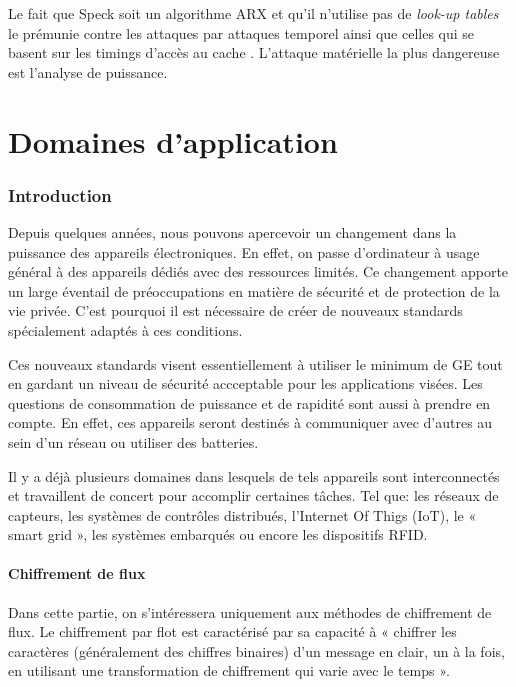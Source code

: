 			Le fait que Speck soit un algorithme ARX
			et qu'il n'utilise pas de \textit{look-up tables} le prémunie contre
			les attaques par attaques temporel ainsi que celles qui se basent sur les
			timings d'accès au cache \cite{speck_design}. L'attaque matérielle
			la plus dangereuse est l'analyse de puissance.

\newpage
\part{Domaines d'application}

	\section{Introduction}


	Depuis quelques années, nous pouvons apercevoir un changement dans la
	puissance des appareils électroniques. En effet, on passe d'ordinateur à usage
	général à des appareils dédiés avec des ressources limités. Ce changement
	apporte un large éventail de préoccupations en matière de sécurité et de
	protection de la vie privée. C'est pourquoi il est nécessaire de créer de
	nouveaux standards spécialement adaptés à ces conditions.

	Ces nouveaux standards visent essentiellement à utiliser le minimum de GE tout
	en gardant un niveau de sécurité accceptable pour les applications visées. Les
	questions de consommation de puissance et de rapidité sont aussi à prendre en
	compte. En effet, ces appareils seront destinés à communiquer avec d'autres au
	sein d'un réseau ou utiliser des batteries.

	Il y a déjà plusieurs domaines dans lesquels de tels appareils sont
	interconnectés et travaillent de concert pour accomplir certaines tâches.
	Tel que: les réseaux de capteurs, les systèmes de contrôles
	distribués, l'Internet Of Thigs (IoT), le « smart grid », les systèmes
	embarqués ou encore les dispositifs RFID.

	\subsection{Chiffrement de flux}

	Dans cette partie, on s'intéressera uniquement aux méthodes de chiffrement
	de flux. Le chiffrement par flot est caractérisé par sa capacité à « chiffrer
	les caractères (généralement des chiffres binaires) d'un message en clair, un à
	la fois, en utilisant une transformation de chiffrement qui varie avec le
	temps »\cite{appliedCrypto}.

